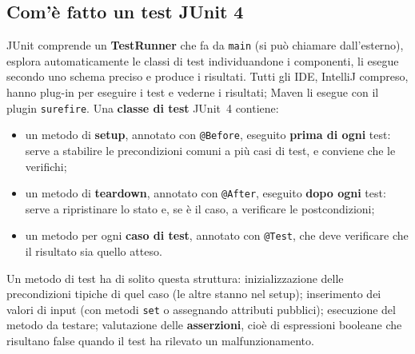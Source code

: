 
\subsection{Com'è fatto un test JUnit 4}

JUnit comprende un \textbf{TestRunner} che fa da \texttt{main} (si può chiamare dall'esterno), esplora automaticamente
le classi di test individuandone i componenti, li esegue secondo uno schema preciso e produce i risultati. Tutti gli
IDE, IntelliJ compreso, hanno plug-in per eseguire i test e vederne i risultati; Maven li esegue con il plugin
\texttt{surefire}. Una \textbf{classe di test} JUnit~4 contiene:

\begin{itemize}
  \item un metodo di \textbf{setup}, annotato con \texttt{@Before}, eseguito \textbf{prima di ogni} test: serve a
        stabilire le precondizioni comuni a più casi di test, e conviene che le verifichi;
  \item un metodo di \textbf{teardown}, annotato con \texttt{@After}, eseguito \textbf{dopo ogni} test: serve a
        ripristinare lo stato e, se è il caso, a verificare le postcondizioni;
  \item un metodo per ogni \textbf{caso di test}, annotato con \texttt{@Test}, che deve verificare che il risultato sia
        quello atteso.
\end{itemize}

Un metodo di test ha di solito questa struttura: inizializzazione delle precondizioni tipiche di quel caso (le altre
stanno nel setup); inserimento dei valori di input (con metodi \texttt{set} o assegnando attributi pubblici); esecuzione
del metodo da testare; valutazione delle \textbf{asserzioni}, cioè di espressioni booleane che risultano false quando il
test ha rilevato un malfunzionamento.

